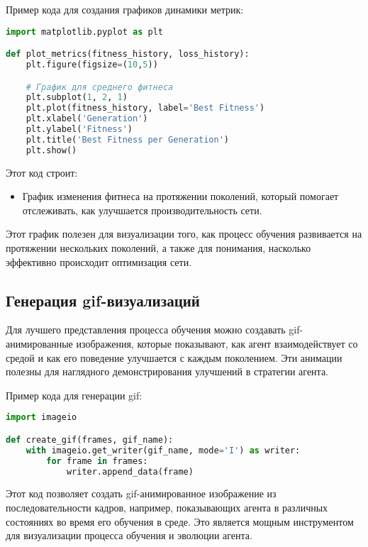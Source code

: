 \documentclass[a4paper,12pt]{article}
\begin{document}
Пример кода для создания графиков динамики метрик:

\begin{lstlisting}[language=Python]
import matplotlib.pyplot as plt

def plot_metrics(fitness_history, loss_history):
    plt.figure(figsize=(10,5))

    # График для среднего фитнеса
    plt.subplot(1, 2, 1)
    plt.plot(fitness_history, label='Best Fitness')
    plt.xlabel('Generation')
    plt.ylabel('Fitness')
    plt.title('Best Fitness per Generation')
    plt.show()
\end{lstlisting}

Этот код строит:
\begin{itemize}
    \item График изменения фитнеса на протяжении поколений, который помогает отслеживать, как улучшается производительность сети.

\end{itemize}

Этот график полезен для визуализации того, как процесс обучения развивается на протяжении нескольких поколений, а также для понимания, насколько эффективно происходит оптимизация сети.

\subsection{Генерация gif-визуализаций}

Для лучшего представления процесса обучения можно создавать gif-анимированные изображения, которые показывают, как агент взаимодействует со средой и как его поведение улучшается с каждым поколением. Эти анимации полезны для наглядного демонстрирования улучшений в стратегии агента.

Пример кода для генерации gif:

\begin{lstlisting}[language=Python]
import imageio

def create_gif(frames, gif_name):
    with imageio.get_writer(gif_name, mode='I') as writer:
        for frame in frames:
            writer.append_data(frame)
\end{lstlisting}

Этот код позволяет создать gif-анимированное изображение из последовательности кадров, например, показывающих агента в различных состояниях во время его обучения в среде. Это является мощным инструментом для визуализации процесса обучения и эволюции агента.
\end{document}
